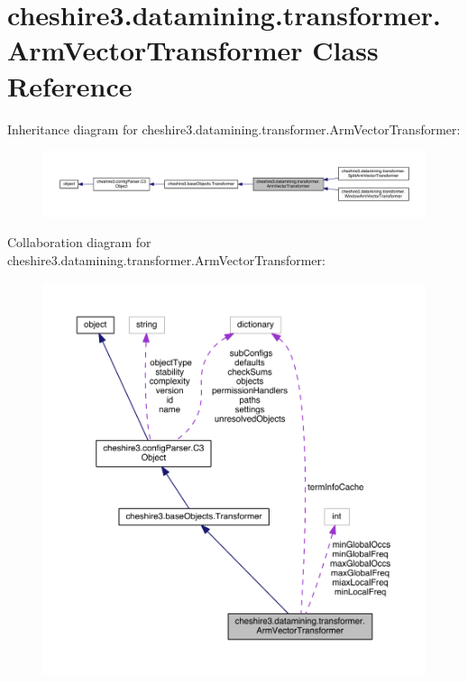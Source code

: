 \hypertarget{classcheshire3_1_1datamining_1_1transformer_1_1_arm_vector_transformer}{\section{cheshire3.\-datamining.\-transformer.\-Arm\-Vector\-Transformer Class Reference}
\label{classcheshire3_1_1datamining_1_1transformer_1_1_arm_vector_transformer}
}


Inheritance diagram for cheshire3.\-datamining.\-transformer.\-Arm\-Vector\-Transformer\-:
\nopagebreak
\begin{figure}[H]
\begin{center}
\leavevmode
\includegraphics[width=350pt]{classcheshire3_1_1datamining_1_1transformer_1_1_arm_vector_transformer__inherit__graph}
\end{center}
\end{figure}


Collaboration diagram for cheshire3.\-datamining.\-transformer.\-Arm\-Vector\-Transformer\-:
\nopagebreak
\begin{figure}[H]
\begin{center}
\leavevmode
\includegraphics[width=350pt]{classcheshire3_1_1datamining_1_1transformer_1_1_arm_vector_transformer__coll__graph}
\end{center}
\end{figure}
